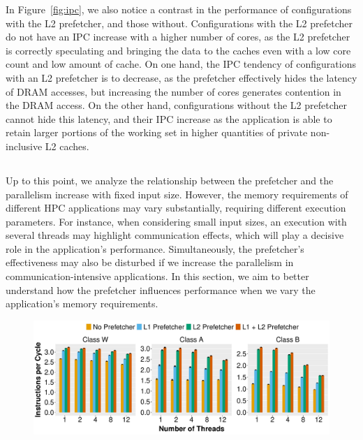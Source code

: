 \documentclass[AMA,final,STIX1COL]{WileyNJD-v2}
\newcommand\new[1]{{\color{red}{#1}}}
\begin{document}
{In Figure~\ref{fig:ipc}, we also notice a contrast in the performance of configurations with the L2 prefetcher, and those without.
Configurations with the L2 prefetcher do not have an IPC increase with a higher number of cores, as the L2 prefetcher is correctly speculating and bringing the data to the caches even with a low core count and low amount of cache.
On one hand, the IPC tendency of configurations with an L2 prefetcher is to decrease, as the prefetcher effectively hides the latency of DRAM accesses, but increasing the number of cores generates contention in the DRAM access.
On the other hand, configurations without the L2 prefetcher cannot hide this latency, and their IPC increase as the application is able to retain larger portions of the working set in higher quantities of private non-inclusive L2 caches.



\subsection{\new{Effects of Different Input Classes}}
\label{subs:NAS_WAB}

Up to this point, we analyze the relationship between the prefetcher and the parallelism increase with fixed input size.
However, the memory requirements of different HPC applications may vary substantially, requiring different execution parameters. 
For instance, when considering small input sizes, an execution with several threads may highlight communication effects, which will play a decisive role in the application's performance.
Simultaneously, the prefetcher's effectiveness may also be disturbed if we increase the parallelism in communication-intensive applications.
In this section, we aim to better understand how the prefetcher influences performance when we vary the application's memory requirements. 


\begin{figure}[!htb]
    \centering
    \includegraphics[width=.9\linewidth]{figures/ipc-sp-w-a-b-real.pdf}
    \caption{\new{IPC results for the real execution of the NPB SP application, using input classes W, A, and B.}}
    \label{fig:nas_wab}
\end{figure}

}
\end{document}
